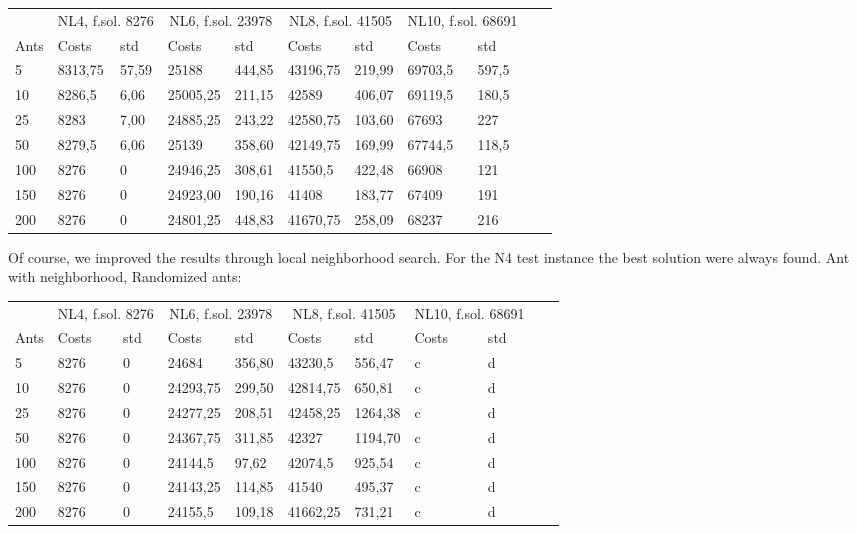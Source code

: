 \begin{minipage}[b]{1.0\textwidth}
    \begin{tabular}{ l | ll | ll | ll | ll | ll}
	\hline
	& \multicolumn{2}{c}{NL4, f.sol. 8276} & \multicolumn{2}{c}{NL6, f.sol. 23978}
	& \multicolumn{2}{c}{NL8, f.sol. 41505} & \multicolumn{2}{c}{NL10, f.sol. 68691} \\
	\cline{1-5}
	Ants & Costs & std & Costs & std & Costs & std & Costs & std \\
	\hline
	5   &  8313,75  & 57,59 &  25188    & 444,85 &  43196,75  & 219,99 &  69703,5  & 597,5 \\
	10  &  8286,5   & 6,06 &  25005,25  & 211,15 &  42589     & 406,07 &  69119,5  & 180,5 \\
	25  &  8283    & 7,00 &  24885,25   & 243,22 &  42580,75  & 103,60 &  67693 	& 227 \\
	50  &  8279,5  & 6,06 &  25139    & 358,60 &  42149,75   & 169,99 &  67744,5    & 118,5 \\
	100 &  8276    & 0 &  24946,25    & 308,61 &  41550,5    & 422,48 &  66908    & 121 \\
	150 &  8276    & 0 &  24923,00    & 190,16 &  41408      & 183,77 &  67409    &
	191 \\ 200 &  8276    & 0 &  24801,25    & 448,83 &  41670,75   & 258,09 &  68237    & 216 \\
	\hline
	\end{tabular}
\end{minipage}
\newline
Of course, we improved the results through local neighborhood search. For the N4
test instance the best solution were always found.
\newline
Ant with neighborhood, Randomized ants:
\newline
\begin{minipage}[b]{1.0\textwidth}
    \begin{tabular}{ l | ll | ll | ll | ll | ll}
	\hline
	& \multicolumn{2}{c}{NL4, f.sol. 8276} & \multicolumn{2}{c}{NL6, f.sol. 23978}
	& \multicolumn{2}{c}{NL8, f.sol. 41505} & \multicolumn{2}{c}{NL10, f.sol. 68691} \\
	\cline{1-5}
	Ants & Costs & std & Costs & std & Costs & std & Costs & std \\
	\hline
	5     &  8276    & 0 &  24684    & 356,80 &  43230,5    & 556,47 &  c    & d \\
	10    &  8276    & 0 &  24293,75 & 299,50 &  42814,75    & 650,81 &  c    & d \\
	25    &  8276    & 0 &  24277,25 & 208,51 &  42458,25    & 1264,38 &  c    & d \\
	50    &  8276    & 0 &  24367,75 & 311,85 &  42327    & 1194,70 &  c    & d \\
	100   &  8276    & 0 &  24144,5  & 97,62  &  42074,5    & 925,54 &  c    & d \\
	150   &  8276    & 0 &  24143,25 & 114,85 &  41540    & 495,37 &  c   & d \\
	200   &  8276    & 0 &  24155,5  & 109,18 &  41662,25    & 731,21 &  c    & d \\
	\hline
	\end{tabular}
\end{minipage}
